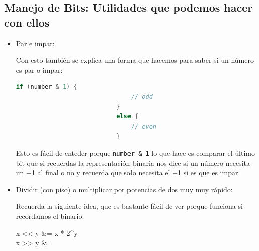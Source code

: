 \documentclass[12pt, fleqn]{report}                             %
\def \Eq {equation}                                             %
\newenvironment{MultiLineEquation*}[1]                          %
        {\begin{\Eq*}\begin{alignedat}{#1}}                         %
        {\end{alignedat}\end{\Eq*}}                                 %
\newenvironment{largeEq} {\begingroup \large}{\endgroup}        %
\theoremstyle{break}                                            %
\newcommand{\textCode}[1]  { \texttt{#1} }                      %
\begin{document}
            \subsection{Manejo de Bits: Utilidades que podemos hacer con ellos}

                \begin{itemize}
                    \item Par e impar:
                    
                        Con esto también se explica una forma que hacemos para saber si un número es 
                        par o impar:
                        \begin{lstlisting}[language=C++, gobble=32]
                            if (number & 1) {
                                // odd
                            }
                            else {
                                // even
                            }
                        \end{lstlisting}

                        Esto es fácil de enteder porque \textCode{number \& 1} lo que hace es comparar el último bit
                        que si recuerdas la representación binaria nos dice si un número necesita un +1 al final 
                        o no y recuerda que solo necesita el +1 si es que es impar.

                    \item Dividir (con piso) o multiplicar por potencias de dos muy muy rápido:
                    
                        Recuerda la siguiente idea, que es bastante fácil de ver porque funciona
                        si recordamos el binario:
                        \begin{largeEq}
                            \begin{MultiLineEquation*}{3}
                                x << y &= x * 2^y                                           \\
                                x >> y &= \left \lfloor {} \right \rfloor 
                            \end{MultiLineEquation*}
                        \end{largeEq}
                \end{itemize}
\end{document}
